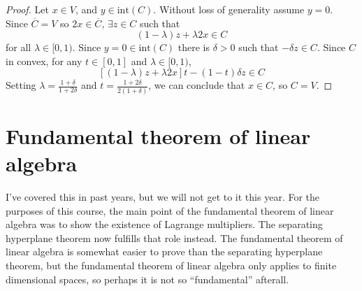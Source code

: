 \begin{proof}
  Let $x \in V$, and $y \in \mathrm{int}(C)$.  Without loss of
  generality assume $y = 0$. Since $\overline{C} = V$ so $2x \in \overline{C}$,
  $\exists z \in C$ such that
  \[ (1-\lambda)z + \lambda 2x \in C \]
  for all $\lambda \in [0,1)$. 
  Since $y = 0 \in \mathrm{int}(C)$ there is $\delta>0$ such that 
  $-\delta z \in C$. Since $C$ in convex, for any $t \in [0,1]$ and
  $\lambda \in [0,1)$,
  \[ [(1-\lambda)z + \lambda 2x] t - (1-t) \delta z \in C \]
  Setting $\lambda = \frac{1+\delta}{1+2\delta}$ and $t =
  \frac{1+2\delta}{2(1+\delta)}$, we can conclude that $x \in C$, so
  $C = V$.  
\end{proof}

\section{Fundamental theorem of linear algebra}
I've covered this in past years, but we will not get to it this
year. For the purposes of this course, the main point of the
fundamental theorem of linear algebra was to show the existence of
Lagrange multipliers. The separating hyperplane theorem now fulfills
that role instead. The fundamental theorem of linear algebra is
somewhat easier to prove than the separating hyperplane theorem, but
the fundamental theorem of linear algebra only applies to finite
dimensional spaces, so perhaps it is not so ``fundamental'' afterall. 

